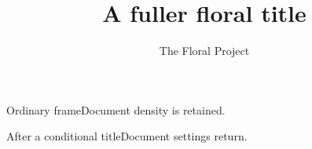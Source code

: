 \documentclass[aspectratio=169]{beamer}
\title{A fuller floral title}
\author{The Floral Project}
\date{}
\begin{document}
\begin{frame}[plain]\titlepage\pause\end{frame}
\begin{frame}{Ordinary frame}Document density is retained.\end{frame}
\begin{frame}[plain]\titlepage\end{frame}
\begin{frame}[plain]
\end{frame}
\begin{frame}{After a conditional title}Document settings return.\end{frame}
\begin{frame}[plain]
\end{frame}
\end{document}
